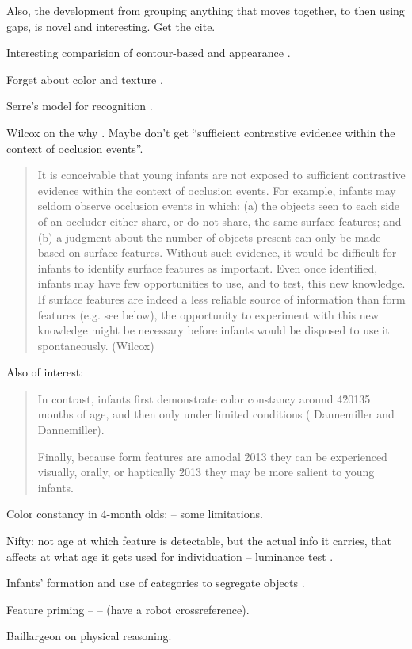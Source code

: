 Also, the development from grouping anything that moves
together, to then using gaps, is novel and interesting.
Get the cite.

Interesting comparision of contour-based
and appearance \cite{leibe03analyzing}.

Forget about color and texture \cite{lecun04learning}.

Serre's model for recognition \cite{serre05object}.


Wilcox on the why \cite{wilcox99object}.  Maybe don't get
``sufficient contrastive evidence within the context of
occlusion events''.

\begin{quote}

It is conceivable that young infants are not exposed to sufficient
contrastive evidence within the context of occlusion events. For
example, infants may seldom observe occlusion events in which: (a) the
objects seen to each side of an occluder either share, or do not
share, the same surface features; and (b) a judgment about the number
of objects present can only be made based on surface features. Without
such evidence, it would be difficult for infants to identify surface
features as important. Even once identified, infants may have few
opportunities to use, and to test, this new knowledge. If surface
features are indeed a less reliable source of information than form
features (e.g. see below), the opportunity to experiment with this new
knowledge might be necessary before infants would be disposed to use
it spontaneously. (Wilcox)

\end{quote}



Also of interest:

\begin{quote}

In contrast, infants first demonstrate color constancy around 4\u20135
months of age, and then only under limited conditions ( Dannemiller
and Dannemiller).

Finally, because form features are amodal \u2013 they can be
experienced visually, orally, or haptically \u2013 they may be more
salient to young infants.

\end{quote}

Color constancy in 4-month olds: \cite{dannemiller87test} -- some 
limitations.

Nifty: not age at which feature is detectable, but the actual
info it carries, that affects at what age it gets used for
individuation -- luminance test \cite{woods05infants}.

Infants' formation and use of categories to segregate objects 
\cite{needham05infants}.

Feature priming -- \cite{wilcox04priming}
--
(have a robot crossreference).

Baillargeon on physical reasoning.

